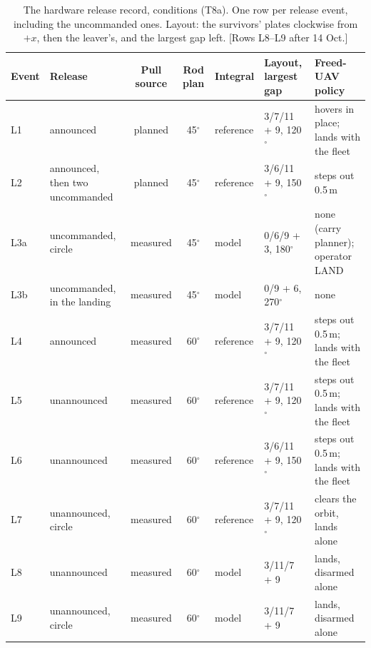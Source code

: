 \begin{table}[htbp]
  \centering
  \footnotesize
  \caption{The hardware release record, conditions (T8a). One row per release event, including the uncommanded
  ones. Layout: the survivors' plates clockwise from $+x$, then the leaver's, and the largest gap left. [Rows L8--L9
  after 14 Oct.]}
  \label{tab:T8a}
  \begin{tabularx}{\textwidth}{lYccYYY}
    \toprule
    Event & Release & Pull source & Rod plan & Integral & Layout, largest gap & Freed-UAV policy \\
    \midrule
    L1 & announced & planned & 45$^\circ$ & reference & 3/7/11 + 9, 120$^\circ$ & hovers in place; lands with the fleet \\ %
    L2 & announced, then two uncommanded & planned & 45$^\circ$ & reference & 3/6/11 + 9, 150$^\circ$ & steps out 0.5\,m \\ %
    L3a & uncommanded, circle & measured & 45$^\circ$ & model & 0/6/9 + 3, 180$^\circ$ & none (carry planner); operator LAND \\ %
    L3b & uncommanded, in the landing & measured & 45$^\circ$ & model & 0/9 + 6, 270$^\circ$ & none \\ %
    L4 & announced & measured & 60$^\circ$ & reference & 3/7/11 + 9, 120$^\circ$ & steps out 0.5\,m; lands with the fleet \\ %
    L5 & unannounced & measured & 60$^\circ$ & reference & 3/7/11 + 9, 120$^\circ$ & steps out 0.5\,m; lands with the fleet \\ %
    L6 & unannounced & measured & 60$^\circ$ & reference & 3/6/11 + 9, 150$^\circ$ & steps out 0.5\,m; lands with the fleet \\ %
    L7 & unannounced, circle & measured & 60$^\circ$ & reference & 3/7/11 + 9, 120$^\circ$ & clears the orbit, lands alone \\ %
    L8 & unannounced & measured & 60$^\circ$ & model & 3/11/7 + 9 & lands, disarmed alone \\
    L9 & unannounced, circle & measured & 60$^\circ$ & model & 3/11/7 + 9 & lands, disarmed alone \\
    \bottomrule
  \end{tabularx}
\end{table}

